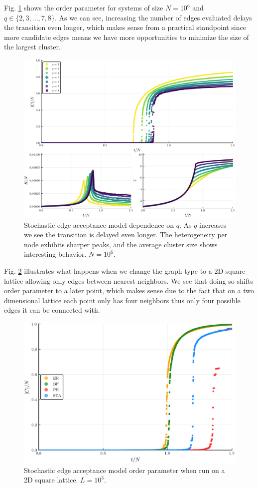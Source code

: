 Fig. \ref{fig:q_scaling_triple} shows the order parameter for systems of size $N = 10^6$ and $q \in \{2, 3, ..., 7, 8\}$. As we can see, increasing the number of edges evaluated delays the transition even longer, which makes sense from a practical standpoint since more candidate edges means we have more opportunities to minimize the size of the largest cluster.

\begin{figure}
	\centering
	\includegraphics[width=350pt, clip]{images/q_scaling_triple.png}
	\caption{Stochastic edge acceptance model dependence on $q$. As $q$ increases we see the transition is delayed even longer. The heterogeneity per node exhibits sharper peaks, and the average cluster size shows interesting behavior. $N = 10^6$.}
	\label{fig:q_scaling_triple}
\end{figure}

Fig. \ref{fig:Lattice2D_ER_BF_PR_SEA_transition} illustrates what happens when we change the graph type to a 2D square lattice allowing only edges between nearest neighbors.
We see that doing so shifts order parameter to a later point, which makes sense due to the fact that on a two dimensional lattice each point only has four neighbors thus only four possible edges it can be connected with.

\begin{figure}[H]
	\centering
	\includegraphics[width=350pt, clip]{images/Lattice2D_ER_BF_PR_SEA_1e6_order_param.png}
	\caption{Stochastic edge acceptance model order parameter when run on a 2D square lattice. $L = 10^3$.}
	\label{fig:Lattice2D_ER_BF_PR_SEA_transition}
\end{figure}

